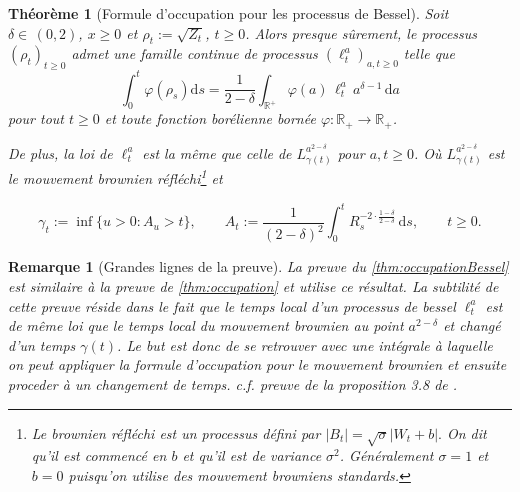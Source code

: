 \documentclass[openany]{book}
\newcommand{\1}{\mathbbm{1}}
\renewcommand{\d}{\mathrm{d}}
\theoremstyle{thmfont}
\newtheorem{theorem}{Théorème}[chapter]
\theoremstyle{deffont}
\theoremstyle{thmfont}
\theoremstyle{deffont}
\newtheorem{remark}[remark]{Remarque}
\begin{document}
\begin{theorem}[Formule d'occupation pour les processus de Bessel]
  \label{thm:occupationBessel}
  Soit $\delta \in \, (0,2)$, $x \geq 0$ et $\rho_t := \sqrt{Z_t}$, $t \geq 0$. Alors presque sûrement, le processus $(\rho_t)_{t \geq 0}$ admet une famille continue de processus $(\ell_t^a)_{a, t \geq 0}$ telle que
\begin{equation}
  \int_0^t \varphi(\rho_s)\d s = \frac{1}{2 - \delta} \int_{\mathbb{R}^+} \varphi(a)\, \ell_t^a\, a^{\delta - 1}\,\d a
  \end{equation}
pour tout $t \geq 0$ et toute fonction borélienne bornée $\varphi : \mathbb{R}_+ \rightarrow \mathbb{R}_+$.

De plus, la loi de $\ell_t^a$ est la même que celle de $L_{\gamma(t)}^{a^{2-\delta}}$ pour $a, t \geq 0$. Où $L_{\gamma(t)}^{a^{2-\delta}}$ est le mouvement brownien réfléchi\footnote{Le brownien réfléchi est un processus défini par $|B_t| = \sqrt{\sigma}|W_t + b|.$ On dit qu'il est commencé en $b$ et qu'il est de variance $\sigma^2$. Généralement $\sigma = 1$ et $b = 0$ puisqu'on utilise des mouvement browniens standards.} et

  $$\gamma_t := \inf\{ u > 0 : A_u > t \}, \qquad
A_t := \frac{1}{(2 - \delta)^2} \int_0^t R_s^{-2 \cdot \frac{1 - \delta}{2 - \delta}} \, \mathrm{d}s, \qquad t \geq 0.
$$
\end{theorem}
\begin{remark}[Grandes lignes de la preuve] La preuve du \autoref{thm:occupationBessel} est similaire à la preuve de \autoref{thm:occupation} et utilise ce résultat. La subtilité de cette preuve réside dans le fait que le temps local d'un processus de bessel $\ell_t^a$ est de même loi que le temps local du mouvement brownien au point $a^{2-\delta}$ et changé d'un temps $\gamma(t)$. Le but est donc de se retrouver avec une intégrale à laquelle on peut appliquer la formule d'occupation pour le mouvement brownien et ensuite proceder à un changement de temps. c.f. preuve de la proposition 3.8 de \cite{zambotti}.
\end{remark}
\end{document}
